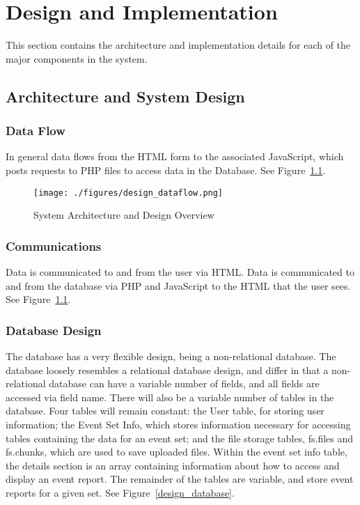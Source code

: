 

\chapter{Design  and Implementation}
This section contains the architecture and implementation details for each of the major components in the system.

 \section{Architecture and System Design}
 
 \subsection{Data Flow} 
 In general data flows from the HTML form to the associated JavaScript, which posts requests to PHP files to access data in the Database. See Figure~\ref{design_dataflow}.

\begin{figure}[tbh]
\begin{center}
\texttt{[image: ./figures/design\_dataflow.png]}
\end{center}
\caption{System Architecture and Design Overview\label{design_dataflow}}
\end{figure}
 
 \subsection{Communications} Data is communicated to and from the user via HTML. Data is communicated to and from the database via PHP and JavaScript to the HTML that the user sees. See Figure~\ref{design_dataflow}.
 
 \subsection{Database Design} The database has a very flexible design, being a non-relational database. The database loosely resembles a relational database design, and differ in that a non-relational database can have a variable number of fields, and all fields are accessed via field name. There will also be a variable number of tables in the database. Four tables will remain constant: the User table, for storing user information; the Event Set Info, which stores information necessary for accessing tables containing the data for an event set; and the file storage tables, fs.files and fs.chunks, which are used to save uploaded files. Within the event set info table, the details section is an array containing information about how to access and display an event report. The remainder of the tables are variable, and store event reports for a given set. See Figure~\ref{design_database}.
 
